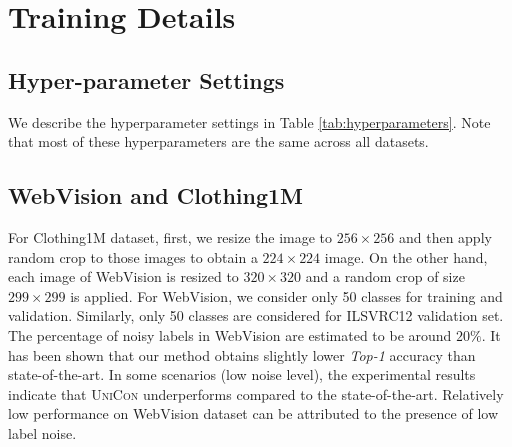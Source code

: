 \documentclass[10pt,twocolumn,letterpaper]{article}
\begin{document}
\section{Training Details} \label{sec:training_details}
\subsection{Hyper-parameter Settings}
We describe the hyperparameter settings in Table \ref{tab:hyperparameters}. Note that most of these hyperparameters are the same across all datasets. 

\subsection{WebVision and Clothing1M}
For Clothing1M dataset, first, we resize the image to $256 \times 256$ and then apply random crop to those images to obtain a $224 \times 224$ image. On the other hand, each image of WebVision is resized to $320 \times 320$ and a random crop of size $299 \times 299$ is applied. For WebVision, we consider only 50 classes for training and validation. Similarly, only 50 classes are considered for ILSVRC12 validation set. The percentage of noisy labels in WebVision are estimated to be around $20\%$. It has been shown that our method obtains slightly lower \emph{Top-1} accuracy than state-of-the-art.  In some scenarios (low noise level), the experimental results indicate that \textsc{UniCon} underperforms compared to the state-of-the-art. Relatively low performance on WebVision dataset can be attributed to the presence of low label noise. 
























    


    
\end{document}
